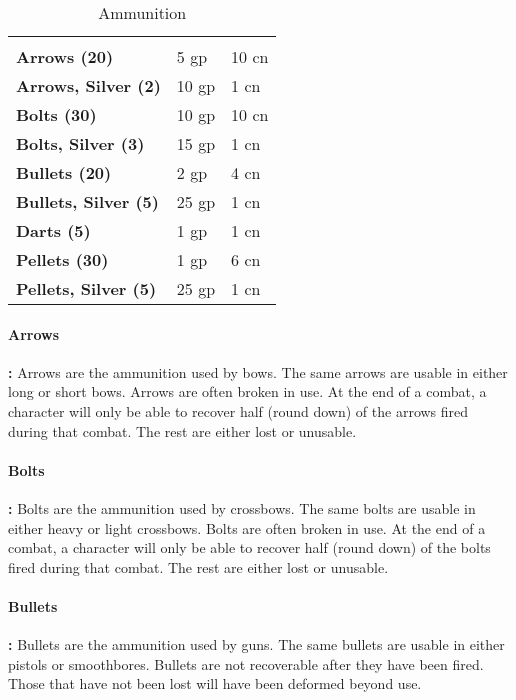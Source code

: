 \begin{multicols*}{2}
\begin {table}[H]
  \caption{Ammunition}
  \begin{tabularx}{\columnwidth}{>{\bfseries}YYY}
		 &  & \\
		Arrows (20) & 5 gp & 10 cn\\
		Arrows, Silver (2) & 10 gp & 1 cn\\
		Bolts (30) & 10 gp & 10 cn\\
		Bolts, Silver (3) & 15 gp & 1 cn\\
		Bullets (20) & 2 gp & 4 cn\\
		Bullets, Silver (5) & 25 gp & 1 cn\\
		Darts (5) & 1 gp & 1 cn\\
		Pellets (30) & 1 gp & 6 cn\\
		Pellets, Silver (5) & 25 gp & 1 cn\
  \end {tabularx}
\end {table}

\paragraph{Arrows}\textbf{:} Arrows are the ammunition used by bows. The same arrows are usable in either long or short bows. Arrows are often broken in use. At the end of a combat, a character will only be able to recover half (round down) of the arrows fired during that combat. The rest are either lost or unusable.

\paragraph{Bolts}\textbf{:} Bolts are the ammunition used by crossbows. The same bolts are usable in either heavy or light crossbows. Bolts are often broken in use. At the end of a combat, a character will only be able to recover half (round down) of the bolts fired during that combat. The rest are either lost or unusable.

\paragraph{Bullets}\textbf{:} Bullets are the ammunition used by guns. The same bullets are usable in either pistols or smoothbores. Bullets are not recoverable after they have been fired. Those that have not been lost will have been deformed beyond use.


\end{multicols*}
